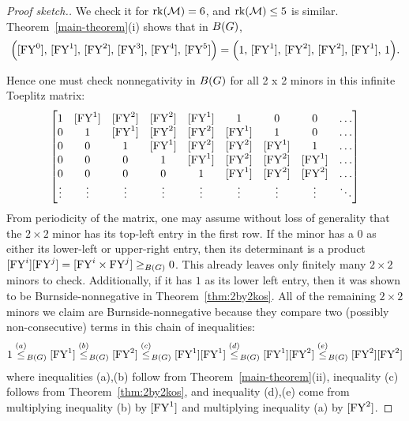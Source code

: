 \begin{proof}[Proof sketch.]
We check it for $\operatorname{\mathrm{rk}}(\mathcal{M})=6$, and $\operatorname{\mathrm{rk}}(\mathcal{M}) \leq 5$ is similar. Theorem~\ref{main-theorem}(i) shows  
that in $B(G)$,
\[
 \Big([\mathrm{FY}^0], \, [\mathrm{FY}^1], \, [\mathrm{FY}^2], \, [\mathrm{FY}^3], \,[\mathrm{FY}^4], \, [\mathrm{FY}^5] \Big)
=
\Big(1, \, [\mathrm{FY}^1], \,[\mathrm{FY}^2], \, [\mathrm{FY}^2], \,[\mathrm{FY}^1], \, 1\Big).
\]

Hence one must check nonnegativity in $B(G)$
for all 2 x 2 minors in this infinite Toeplitz matrix:
\[
\begin{bmatrix}
    1 & [\mathrm{FY}^1] & [\mathrm{FY}^2] & [\mathrm{FY}^2] & [\mathrm{FY}^1] & 1 & 0 & 0 & \ldots \\
    0 & 1 & [\mathrm{FY}^1] & [\mathrm{FY}^2] & [\mathrm{FY}^2] & [\mathrm{FY}^1] & 1 & 0 & \ldots \\
    0 & 0 & 1 & [\mathrm{FY}^1] & [\mathrm{FY}^2] & [\mathrm{FY}^2] & [\mathrm{FY}^1] & 1 & \ldots \\
    0 & 0 & 0 & 1 & [\mathrm{FY}^1] & [\mathrm{FY}^2] & [\mathrm{FY}^2] & [\mathrm{FY}^1] & \ldots \\
    0 & 0 & 0 & 0 & 1& [\mathrm{FY}^1] & [\mathrm{FY}^2] & [\mathrm{FY}^2] & \ldots \\
    \vdots & \vdots & \vdots & \vdots & \vdots & \vdots & \vdots & \vdots & \ddots \\
\end{bmatrix}
\]
From periodicity of the matrix, one may assume without loss of generality that the $2 \times 2$ minor has its top-left entry in the first row.  If the minor has a $0$ as either its lower-left or upper-right entry, then its determinant is a product $[\mathrm{FY}^i] [\mathrm{FY}^j] = [\mathrm{FY}^i \times \mathrm{FY}^j] \geq_{B(G)} 0$. This already leaves only finitely many $2 \times 2$ minors to check.  Additionally, if it has $1$ as its lower left entry, then it was shown to be Burnside-nonnegative
in Theorem~\ref{thm:2by2kos}.  All of the remaining $2 \times 2$ minors we claim 
are Burnside-nonnegative because they compare two (possibly non-consecutive) terms in this chain of inequalities:
$$
1
\overset{(a)}{\leq}_{B(G)}[\mathrm{FY}^1] 
\overset{(b)}{\leq}_{B(G)} [\mathrm{FY}^2] 
\overset{(c)}{\leq}_{B(G)} [\mathrm{FY}^1][\mathrm{FY}^1] 
\overset{(d)}{\leq}_{B(G)} [\mathrm{FY}^1][\mathrm{FY}^2] 
\overset{(e)}{\leq}_{B(G)} [\mathrm{FY}^2][\mathrm{FY}^2]
$$
where inequalities (a),(b) follow from Theorem~\ref{main-theorem}(ii), inequality (c) follows from Theorem~\ref{thm:2by2kos}, and inequality (d),(e) come from multiplying inequality (b) by $[\mathrm{FY}^1]$ and multiplying inequality (a) by $[\mathrm{FY}^2]$.
\begin{comment}
We will check that this theorem holds for the case $\rk(\M)=6$; the lower-rank cases are proved similarly. We must check that each $2 \times 2$ minor of the infinite Toeplitz matrix $T(FY^0, \ldots, FY^r)$ is Burnside-nonnegative.


\end{comment}
\end{proof}
